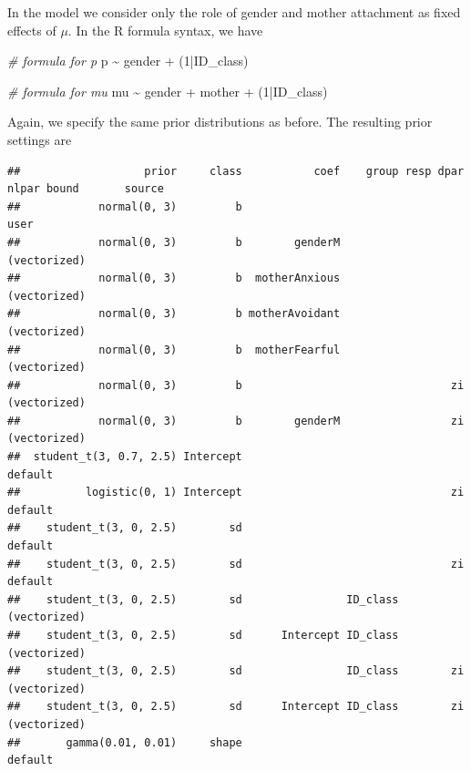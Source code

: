 \documentclass[
]{book}
\newenvironment{Shaded}{\begin{snugshade}}{\end{snugshade}}
\newcommand{\CommentTok}[1]{\textcolor[rgb]{0.56,0.35,0.01}{\textit{#1}}}
\newcommand{\DecValTok}[1]{\textcolor[rgb]{0.00,0.00,0.81}{#1}}
\newcommand{\NormalTok}[1]{#1}
\newcommand{\SpecialCharTok}[1]{\textcolor[rgb]{0.00,0.00,0.00}{#1}}
\begin{document}
In the model we consider only the role of gender and mother attachment as fixed effects of \(\mu\). In the R formula syntax, we have

\begin{Shaded}
\begin{Highlighting}[]
\CommentTok{\# formula for p}
\NormalTok{p }\SpecialCharTok{\textasciitilde{}}\NormalTok{ gender }\SpecialCharTok{+}\NormalTok{ (}\DecValTok{1}\SpecialCharTok{|}\NormalTok{ID\_class)}

\CommentTok{\# formula for mu}
\NormalTok{mu }\SpecialCharTok{\textasciitilde{}}\NormalTok{ gender }\SpecialCharTok{+}\NormalTok{ mother }\SpecialCharTok{+}\NormalTok{ (}\DecValTok{1}\SpecialCharTok{|}\NormalTok{ID\_class)}
\end{Highlighting}
\end{Shaded}

Again, we specify the same prior distributions as before. The resulting prior settings are

\begin{verbatim}
##                   prior     class           coef    group resp dpar nlpar bound       source
##            normal(0, 3)         b                                                       user
##            normal(0, 3)         b        genderM                                (vectorized)
##            normal(0, 3)         b  motherAnxious                                (vectorized)
##            normal(0, 3)         b motherAvoidant                                (vectorized)
##            normal(0, 3)         b  motherFearful                                (vectorized)
##            normal(0, 3)         b                                zi             (vectorized)
##            normal(0, 3)         b        genderM                 zi             (vectorized)
##  student_t(3, 0.7, 2.5) Intercept                                                    default
##          logistic(0, 1) Intercept                                zi                  default
##    student_t(3, 0, 2.5)        sd                                                    default
##    student_t(3, 0, 2.5)        sd                                zi                  default
##    student_t(3, 0, 2.5)        sd                ID_class                       (vectorized)
##    student_t(3, 0, 2.5)        sd      Intercept ID_class                       (vectorized)
##    student_t(3, 0, 2.5)        sd                ID_class        zi             (vectorized)
##    student_t(3, 0, 2.5)        sd      Intercept ID_class        zi             (vectorized)
##       gamma(0.01, 0.01)     shape                                                    default
\end{verbatim}
\end{document}
